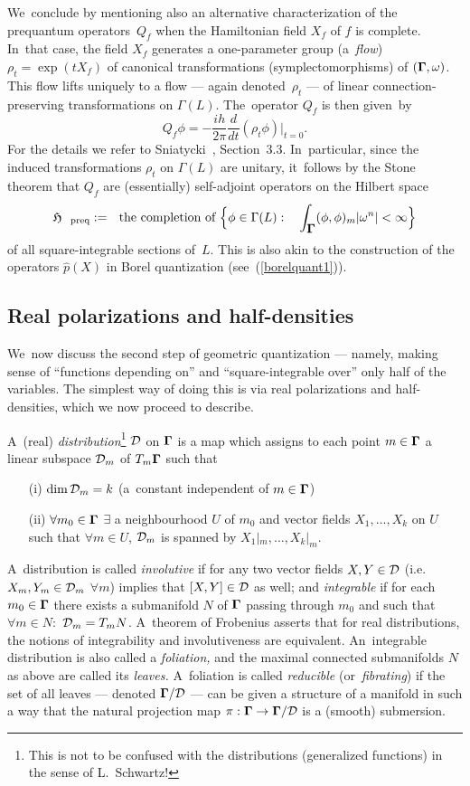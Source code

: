 \documentclass[11pt]{amsart}
\numberwithin{equation}{section}
\theoremstyle{remark}
\newcommand\into{\int_\Omg}
\newcommand\Omg{{\bigam}}   %
\newcommand\DD{{\Cal D}}
\newcommand\MD{{\Omg/\DD}}
\newcommand\HH{\mathfrak H}
\newcommand{\bigam}{\mbox{\boldmath $\Gamma$}}
\begin{document}
We~conclude by mentioning also an alternative characterization of the
prequantum operators~$Q_f$ when the Hamiltonian field $X_f$ of $f$ is complete.
In~that case, the field $X_f$ generates a one-parameter group (a~{\sl flow\/})
$\rho_t=\exp(t X_f)$ of canonical transformations (symplectomorphisms) of
$(\Omg,\omega)$. This flow lifts uniquely to a flow --- again denoted~$\rho_t$
--- of linear connection-preserving transformations on $\Gamma(L)$.
The~operator $Q_f$ is then given~by
$$ Q_f \phi = -\frac{ih}{2\pi} \frac d{dt} (\rho_t\phi) \big|_{t=0}.  $$
For the details we refer to Sniatycki~\cite{bib:SniaB}, Section~3.3.
In~particular, since the induced transformations $\rho_t$ on $\Gamma(L)$ are
unitary, it~follows by the Stone theorem that $Q_f$ are (essentially)
self-adjoint operators on the Hilbert space
$$ \HH_{\text{preq}}:=\text{the completion of } \Big\{\phi\in\Gamma(L): \;
\text{$\into (\phi,\phi)_m |\omega^n| <\infty$}  \Big\}  $$
of all square-integrable sections of~$L$. This is also akin to the construction
of the operators $\widehat{p}(X)$ in Borel quantization
(see~(\ref{borelquant1})).



\subsection{Real polarizations and half-densities}\label{sec22}
We~now discuss the second step of geometric quantization --- namely, making
sense of ``functions depending on'' and ``square-integrable over'' only half of
the variables. The simplest way of doing this is via real polarizations and
half-densities, which we now proceed to describe.

A~(real) {\sl distribution\/}\footnote{This is not to be confused with the
distributions (generalized functions) in the sense of L.~Schwartz!} $\DD$ on
$\Omg$ is a map which assigns to each point $m\in \Omg$ a linear subspace
$\DD_m$ of $T_m \Omg$ such that \begin{enumerate}
\item[(i)] $\dim\DD_m=k$ (a~constant independent of $m\in \Omg$)
\item[(ii)] $\forall m_0\in \Omg$ $\exists$ a neighbourhood $U$ of $m_0$ and
vector fields $X_1,\dots,X_k$ on $U$ such that $\forall m\in U$, $\DD_m$ is
spanned by $X_1|_m,\dots,X_k|_m$. \end{enumerate}
A~distribution is called {\sl involutive\/} if for any two vector fields
$X,Y\in\DD$ (i.e.~$X_m,Y_m\in\DD_m$ $\forall m$) implies that $[X,Y]\in\DD$ as
well; and {\sl integrable\/} if for each $m_0\in \Omg$ there exists a
submanifold $N$ of $\Omg$ passing through $m_0$ and such that $\forall m\in N:$
$\DD_m=T_m N$. A~theorem of Frobenius asserts that for real distributions, the
notions of integrability and involutiveness are equivalent. An~integrable
distribution is also called a {\sl foliation,\/} and the maximal connected
submanifolds $N$ as above are called its {\sl leaves.\/} A~foliation is called
{\sl reducible\/} (or~{\sl fibrating\/}) if the set of all leaves --- denoted
$\MD$ --- can be given a structure of a manifold in such a way that the natural
projection map $\pi:\Omg\to \MD$ is a (smooth) submersion.
\end{document}
